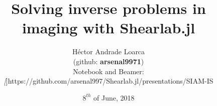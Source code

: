 \title[SIAM IS 2018]{Solving inverse problems in imaging with Shearlab.jl}
\author[H\'ector Andrade Loarca (TUB)]{H\'ector Andrade Loarca\\ \medskip \scriptsize (github: \textbf{arsenal9971})\\Notebook and Beamer:\\\textit[]{https://github.com/arsenal997/Shearlab.jl/presentations/SIAM-IS}} 
\date[08.06.2018]{$8^{th}$ of June, 2018}


\newcommand{\mylogo}{\texttt{[image: ./Images/AFG.pdf]}}

\begin{frame}[plain]
        \titlepage
\end{frame}

